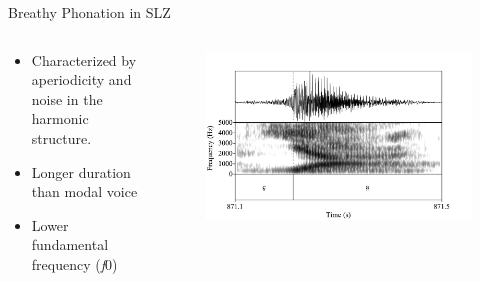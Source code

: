 \documentclass[professionalfonts]{beamer}
\begin{document}
\begin{frame}{Breathy Phonation in SLZ}
  \begin{columns}
    \begin{column}{0.33\linewidth}
      \begin{itemize}
        \item Characterized by aperiodicity and noise in the harmonic structure.
        \item Longer duration than modal voice
        \item Lower fundamental frequency (\textit{f}0)
      \end{itemize}  
    \end{column}
    \begin{column}{0.67\linewidth}
      \begin{figure}
        \centering
        \includegraphics[width=\textwidth]{images/Spectrograms/yah.png}
      \end{figure}
    \end{column}
  \end{columns}
\end{frame}
\end{document}
